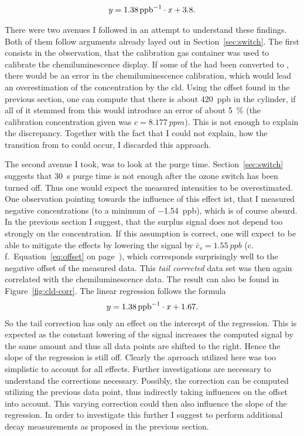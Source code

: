 \begin{align*}
  y = \SI{1.38}{{ppb}\tothe{-1}} \cdot x + 3.8.
\end{align*}

There were two avenues I followed in an attempt to understand these
findings. Both of them follow arguments already layed out in
Section~\ref{sec:switch}. The first consists in the observation, that
the  calibration gas container was used to calibrate the
chemiluminescence display. If some of the  had been converted
to , there would be an error in the chemiluminescence
calibration, which would lead an overestimation of the 
concentration by the cld. Using the 
offset found in the previous section, one can compute that there is
about \SI{420}{ppb}  in the cylinder, if all of it stemmed
from  this would introduce an error of about \SI{5}{\percent}
(the calibration concentration given was $c = \SI{8.177}{ppm}$). This
is not enough to explain the discrepancy. Together with the fact that
I could not explain, how the transition from  to  could
occur, I discarded this approach.

The second avenue I took, was to look at the purge time.
Section~\ref{sec:switch} suggests that \SI{30}{\second} purge time is
not enough after the ozone switch has been turned off. Thus one would
expect the measured  intensities to be overestimated. One
observation pointing towards the influence of this effect ist, that I
measured negative  concentrations (to a minimum of
\SI{-1.54}{ppb}), which is of course absurd. In the previous section I
suggest, that the surplus  signal does not depend too strongly
on the  concentration. If this assumption is correct, one will
expect to be able to mitigate the effects by lowering the 
signal by $\bar c_s = \SI{1.55}{ppb}$ (c.\,f.\
Equation~\eqref{eq:offset} on page~\pageref{eq:offset}), which
corresponds surprisingly well to the negative offset of the measured
data. This \emph{tail corrected} data set was then again correlated
with the chemiluminescence data. The result can also be found in
Figure~\ref{fig:cld-corr}. The linear regression follows the formula
\begin{align*}
  y = \SI{1.38}{ppb\tothe{-1}} \cdot x + 1.67.
\end{align*}
So the tail correction has only an effect on the
intercept of the regression. This is expected as the constant lowering
of the \ch{NO2} signal increases the computed \ch{NO} signal by the
same amount and thus all data points are shifted to the
right. Hence the slope of the regression is still off. Clearly the
aprroach utilized here was too simplistic to account for all
effects. Further investigations are necessary to understand the
corrections necessary. Possibly, the  correction can be
computed utilizing the previous  data point, thus indirectly
taking \ch{NO} influences on the offset into account. This varying 
correction could then also influence the slope of the
regression. In order to investigate this further I suggest to perform
additional decay measurements as proposed in the previous section.

